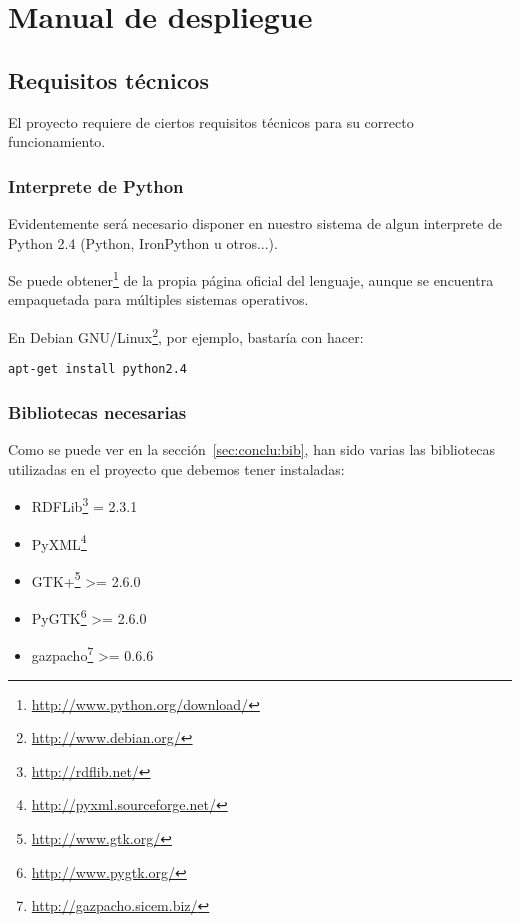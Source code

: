 
\section{Manual de despliegue}

\subsection*{Requisitos técnicos}

El proyecto requiere de ciertos requisitos técnicos para su correcto
funcionamiento.

\subsubsection*{Interprete de Python}

Evidentemente será necesario disponer en nuestro sistema de algun interprete
de Python 2.4 (Python, IronPython u otros...).

Se puede obtener\footnote{\url{http://www.python.org/download/}} de la propia 
página oficial del lenguaje, aunque se encuentra empaquetada para múltiples
sistemas operativos.

En Debian GNU/Linux\footnote{\url{http://www.debian.org/}}, por ejemplo, bastaría
con hacer:

\begin{center}
	\texttt{apt-get install python2.4}
\end{center}

\subsubsection*{Bibliotecas necesarias}

Como se puede ver en la sección~\ref{sec:conclu:bib}, han sido varias las
bibliotecas utilizadas en el proyecto que debemos tener instaladas:

\begin{itemize}
  \item RDFLib\footnote{\url{http://rdflib.net/}} = 2.3.1
  \item PyXML\footnote{\url{http://pyxml.sourceforge.net/}}
  \item GTK+\footnote{\url{http://www.gtk.org/}} >= 2.6.0
  \item PyGTK\footnote{\url{http://www.pygtk.org/}} >= 2.6.0
  \item gazpacho\footnote{\url{http://gazpacho.sicem.biz/}} >= 0.6.6
\end{itemize}

